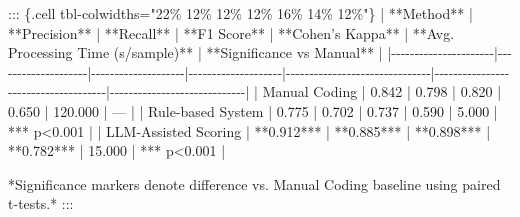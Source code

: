 \documentclass[
  12pt,
]{article}
\newenvironment{Shaded}{\begin{snugshade}}{\end{snugshade}}
\newcommand{\NormalTok}[1]{\textcolor[rgb]{0.00,0.23,0.31}{#1}}
\newcommand{\PreprocessorTok}[1]{\textcolor[rgb]{0.68,0.00,0.00}{#1}}
\begin{document}
\begin{Shaded}
\begin{Highlighting}[]
\NormalTok{::: \{.cell tbl{-}colwidths="22\% 12\% 12\% 12\% 16\% 14\% 12\%"\}}
\PreprocessorTok{|}\NormalTok{ **Method**           | **Precision**      | **Recall**         | **F1 Score**       | **Cohen’s Kappa**              | **Avg. Processing Time (s/sample)** | **Significance vs Manual** }\PreprocessorTok{|}
\PreprocessorTok{|{-}{-}{-}{-}{-}{-}{-}{-}{-}{-}{-}{-}{-}{-}{-}{-}{-}{-}{-}{-}{-}{-}|{-}{-}{-}{-}{-}{-}{-}{-}{-}{-}{-}{-}{-}{-}{-}{-}{-}{-}{-}{-}|{-}{-}{-}{-}{-}{-}{-}{-}{-}{-}{-}{-}{-}{-}{-}{-}{-}{-}{-}{-}|{-}{-}{-}{-}{-}{-}{-}{-}{-}{-}{-}{-}{-}{-}{-}{-}{-}{-}{-}{-}|{-}{-}{-}{-}{-}{-}{-}{-}{-}{-}{-}{-}{-}{-}{-}{-}{-}{-}{-}{-}{-}{-}{-}{-}{-}{-}{-}{-}{-}{-}{-}|{-}{-}{-}{-}{-}{-}{-}{-}{-}{-}{-}{-}{-}{-}{-}{-}{-}{-}{-}{-}{-}{-}{-}{-}{-}{-}{-}{-}{-}{-}{-}{-}{-}{-}{-}{-}{-}|{-}{-}{-}{-}{-}{-}{-}{-}{-}{-}{-}{-}{-}{-}{-}{-}{-}{-}{-}{-}{-}{-}{-}{-}{-}{-}{-}{-}{-}|}
\PreprocessorTok{|}\NormalTok{ Manual Coding         }\PreprocessorTok{|}\NormalTok{ 0.842              }\PreprocessorTok{|}\NormalTok{ 0.798              }\PreprocessorTok{|}\NormalTok{ 0.820              }\PreprocessorTok{|}\NormalTok{ 0.650                         }\PreprocessorTok{|}\NormalTok{ 120.000                             }\PreprocessorTok{|}\NormalTok{ —                           }\PreprocessorTok{|}
\PreprocessorTok{|}\NormalTok{ Rule{-}based System     }\PreprocessorTok{|}\NormalTok{ 0.775              }\PreprocessorTok{|}\NormalTok{ 0.702              }\PreprocessorTok{|}\NormalTok{ 0.737              }\PreprocessorTok{|}\NormalTok{ 0.590                         }\PreprocessorTok{|}\NormalTok{ 5.000                              }\PreprocessorTok{|}\NormalTok{ *** p\textless{}0.001                 }\PreprocessorTok{|}
\PreprocessorTok{|}\NormalTok{ LLM{-}Assisted Scoring  }\PreprocessorTok{|}\NormalTok{ **0.912***         | **0.885***         | **0.898***         | **0.782***                    }\PreprocessorTok{|}\NormalTok{ 15.000                             }\PreprocessorTok{|}\NormalTok{ *** p\textless{}0.001                 }\PreprocessorTok{|}

\NormalTok{*Significance markers denote difference vs. Manual Coding baseline using paired t{-}tests.*  }
\NormalTok{:::}


\end{Highlighting}
\end{Shaded}
\end{document}
